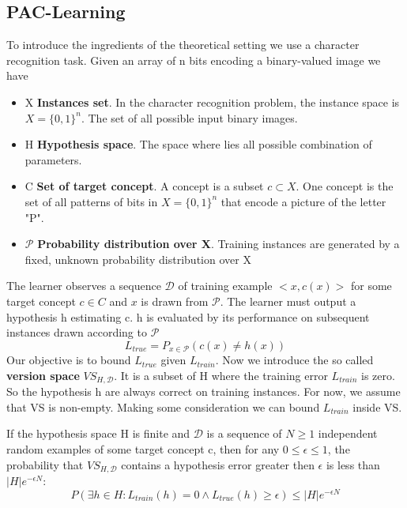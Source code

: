 \documentclass[main.tex]{subfiles}
\begin{document}
\subsection{PAC-Learning}
To introduce the ingredients of the theoretical setting we use a character recognition task. Given an array of n bits encoding a binary-valued image we have
\begin{itemize}
    \item X \textbf{Instances set}. In the character recognition problem, the instance space is $X=\{0,1\}^{n}$. The set of all possible input binary images.
    \item H \textbf{Hypothesis space}. The space where lies all possible combination of parameters.
    \item C \textbf{Set of target concept}. A concept is a subset $c\subset X$. One concept is the set of all patterns of bits in  $X=\{0,1\}^{n}$ that encode a picture of the letter "P".
    \item $\mathcal{P}$ \textbf{Probability distribution over X}. Training instances are generated by a fixed, unknown probability distribution over X
\end{itemize}
The learner observes a sequence $\mathcal{D}$ of training example $<x,c(x)>$ for some target concept $c \in C$ and $x$ is drawn from $\mathcal{P}$. The learner must output a hypothesis h estimating c. h is evaluated by its performance on subsequent instances drawn according to $\mathcal{P}$
\begin{equation*}
    L_{true} = P_{x \in \mathcal{P}}(c(x) \neq h(x))
\end{equation*}
Our objective is to bound $L_{true}$ given $L_{train}$.
Now we introduce the so called \textbf{version space} $VS_{H,\mathcal{D}}$. It is a subset of H where the training error $L_{train}$ is zero. So the hypothesis h are always correct on training instances. For now, we assume that VS is non-empty. Making some consideration we can bound $L_{train}$ inside VS.
\begin{theorem}
If the hypothesis space H is finite and $\mathcal{D}$ is a sequence of $N \geq 1$ independent random examples of some target concept c, then for any $0 \leq \epsilon \leq 1$, the probability that $VS_{H,\mathcal{D}}$ contains a hypothesis error greater then $\epsilon$ is less than $|H|e^{−\epsilon N}$:
\begin{equation*}
    P(\exists h \in H: L_{train}(h)=0 \land L_{true}(h) \geq \epsilon) \leq |H|e^{−\epsilon N}
\end{equation*}
\end{theorem}
\end{document}
